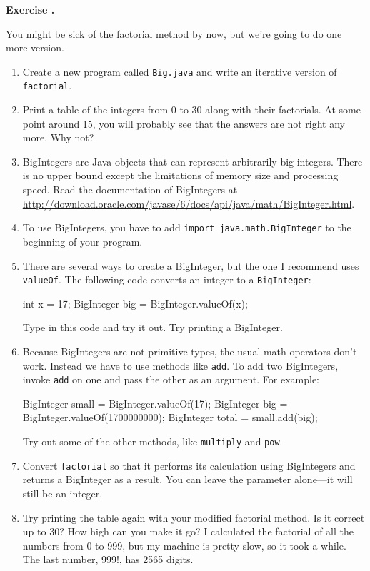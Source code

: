 \documentclass{book}
\newcounter{exercisenum}
\renewcommand{\theexercisenum}{{\thechapter}.\arabic{exercisenum}}
\newenvironment{exercisesize}{\begin{small}}{\end{small}}
\newcommand{\exerciseheader}[2]{                                          
     
  \begin{exercisesize}                                                    
     
     
  \def\theenumi{\alph{enumi}}                                             
  \def\labelenumi{\theenumi.}                                             
  \def\theenumii{\roman{enumii}}                                          
  \def\labelenumii{\theenumii.}                                           
  {\bf Exercise {#1}{#2}}\hspace{0.1in}                 
}
\newcommand{\startexercise}[1]{%
  \refstepcounter{exercisenum}                                            
  \exerciseheader{\theexercisenum}{#1}                                    
}
\newcommand{\stopexercise}{%
  {\hfill}                                                               
  \end{exercisesize}      
}
\newcommand{\normaldif}{}
\newenvironment{exercise}{\startexercise{\normaldif{}}}{\stopexercise}
\begin{document}
\begin{exercise}
You might be sick of the factorial
method by now, but we're going to do one more version.

\begin{enumerate}

\item Create a new program called {\tt Big.java} and
write an iterative version of {\tt factorial}.

\item Print a table of the integers from 0 to 30 along with their
factorials.  At some point around 15, you will probably see
that the answers are not right any more.  Why not?

\item BigIntegers are Java objects that can represent arbitrarily big
  integers.  There is no upper bound except the limitations of memory
  size and processing speed.  Read the documentation of BigIntegers at
  \url{http://download.oracle.com/javase/6/docs/api/java/math/BigInteger.html}.

\item To use BigIntegers, you have to add {\tt import
java.math.BigInteger} to the beginning of your program.

\item There are several ways to create a
BigInteger, but the one I recommend uses {\tt valueOf}.
The following code converts an integer to a {\tt BigInteger}:

\begin{verbatimtab}
    int x = 17;
    BigInteger big = BigInteger.valueOf(x);
\end{verbatimtab}

Type in this code and try it out.  Try printing a BigInteger.

\item Because BigIntegers are not primitive types,
the usual math operators don't work.  Instead we
have to use methods like {\tt add}.  To
add two BigIntegers, invoke {\tt add} on one
and pass the other as an argument.  For example:

\begin{verbatimtab}
    BigInteger small = BigInteger.valueOf(17); 
    BigInteger big = BigInteger.valueOf(1700000000); 
    BigInteger total = small.add(big);
\end{verbatimtab}

Try out some of the other methods, like {\tt multiply} and
{\tt pow}.

\item Convert {\tt factorial} so that it performs its calculation
using BigIntegers and returns a BigInteger as a result.
You can leave the parameter alone---it will still be an integer.

\item Try printing the table again with your modified factorial
method.  Is it correct up to 30?  How high can you make it go?  I
calculated the factorial of all the numbers from 0 to 999, but my
machine is pretty slow, so it took a while.  The last number, 999!,
has 2565 digits.

\end{enumerate}
\end{exercise}
\end{document}
